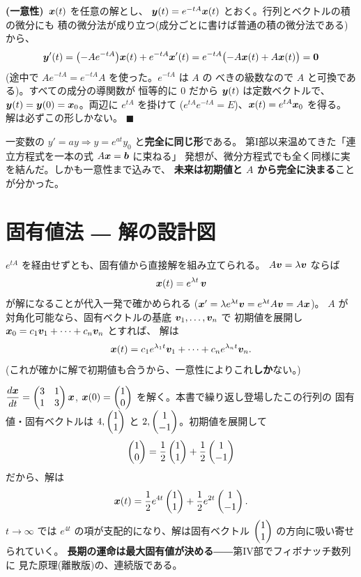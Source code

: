 \textbf{(一意性)}\ $\bm{x}(t)$ を任意の解とし、
$\bm{y}(t) = e^{-tA}\bm{x}(t)$ とおく。行列とベクトルの積の微分にも
積の微分法が成り立つ(成分ごとに書けば普通の積の微分法である)から、
\[
\bm{y}'(t) = \bigl(-Ae^{-tA}\bigr)\bm{x}(t) + e^{-tA}\bm{x}'(t)
= e^{-tA}\bigl(-A\bm{x}(t) + A\bm{x}(t)\bigr) = \bm{0}
\]
(途中で $Ae^{-tA} = e^{-tA}A$ を使った。$e^{-tA}$ は $A$ の
べきの級数なので $A$ と可換である)。すべての成分の導関数が
恒等的に $0$ だから $\bm{y}(t)$ は定数ベクトルで、
$\bm{y}(t) = \bm{y}(0) = \bm{x}_0$。両辺に $e^{tA}$ を掛けて
($e^{tA}e^{-tA} = E$)、$\bm{x}(t) = e^{tA}\bm{x}_0$ を得る。
解は必ずこの形しかない。 $\blacksquare$

一変数の $y' = ay \Rightarrow y = e^{at}y_0$ と\textbf{完全に同じ形}である。
第I部以来温めてきた「連立方程式を一本の式 $A\bm{x} = \bm{b}$ に束ねる」
発想が、微分方程式でも全く同様に実を結んだ。しかも一意性まで込みで、
\textbf{未来は初期値と $A$ から完全に決まる}ことが分かった。

\section{固有値法 ― 解の設計図}

$e^{tA}$ を経由せずとも、固有値から直接解を組み立てられる。
$A\bm{v} = \lambda\bm{v}$ ならば
\[
\bm{x}(t) = e^{\lambda t}\,\bm{v}
\]
が解になることが代入一発で確かめられる
($\bm{x}' = \lambda e^{\lambda t}\bm{v} = e^{\lambda t}A\bm{v} = A\bm{x}$)。
$A$ が対角化可能なら、固有ベクトルの基底 $\bm{v}_1, \dots, \bm{v}_n$ で
初期値を展開し $\bm{x}_0 = c_1\bm{v}_1 + \cdots + c_n\bm{v}_n$ とすれば、
解は
\[
\bm{x}(t) = c_1 e^{\lambda_1 t}\bm{v}_1 + \cdots + c_n e^{\lambda_n t}\bm{v}_n.
\]
(これが確かに解で初期値も合うから、一意性によりこれ\textbf{しか}ない。)

\begin{rei}\label{rei:ode-eigen}
$\dfrac{d\bm{x}}{dt} = \begin{pmatrix}3 & 1 \\ 1 & 3\end{pmatrix}\bm{x}$,
$\bm{x}(0) = \begin{pmatrix}1 \\ 0\end{pmatrix}$ を解く。本書で繰り返し登場したこの行列の
固有値・固有ベクトルは $4, \begin{pmatrix}1 \\ 1\end{pmatrix}$ と $2, \begin{pmatrix}1 \\ -1\end{pmatrix}$。初期値を展開して
\[
\begin{pmatrix}1 \\ 0\end{pmatrix} = \frac{1}{2}\begin{pmatrix}1 \\ 1\end{pmatrix} + \frac{1}{2}\begin{pmatrix}1 \\ -1\end{pmatrix}
\]
だから、解は
\[
\bm{x}(t) = \frac{1}{2}e^{4t}\begin{pmatrix}1 \\ 1\end{pmatrix} + \frac{1}{2}e^{2t}\begin{pmatrix}1 \\ -1\end{pmatrix}.
\]
$t \to \infty$ では $e^{4t}$ の項が支配的になり、解は固有ベクトル
$\begin{pmatrix}1 \\ 1\end{pmatrix}$ の方向に吸い寄せられていく。
\textbf{長期の運命は最大固有値が決める}――第IV部でフィボナッチ数列に
見た原理(離散版)の、連続版である。
\end{rei}

